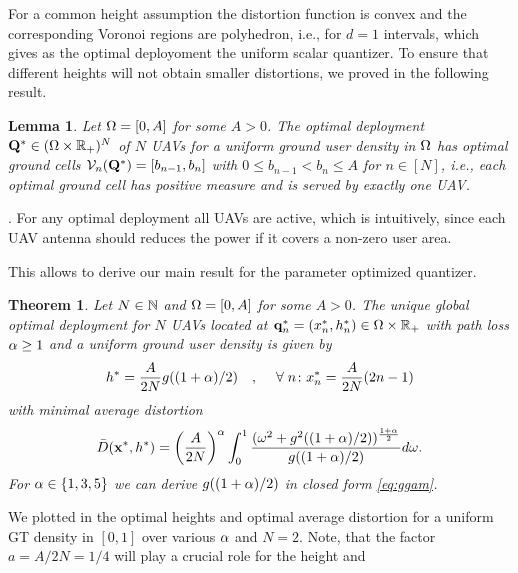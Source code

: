 \documentclass[smallabstract,smallcaptions]{dccpaper}
\newtheorem{lemma}{Lemma}
\newtheorem{theorem}{Theorem}
\newenvironment{remark}{\par\vspace{1.5ex}\noindent{\em Remark\/}.}{\par\vspace{1.5ex}}
\newcommand{\Vor}{\ensuremath{\mathcal{V}}}         %
\newcommand{\Dis}{\ensuremath{D}}                    %
\newcommand{\AvDis}{\ensuremath{\bar{\Dis}}}         %
\newcommand{\philippstart}{\color{black}}
\begin{document}
\newcommand{\pGlob}{\ensuremath{x^{*}}}
\newcommand{\hGlob}{\ensuremath{h^{*}}}
\newcommand{\qGlob}{\ensuremath{{\mathbf q}^{*}}}
\newcommand{\qLoc}{\ensuremath{{\mathbf q}^{*}}}
%
%
\philippstart
%
%
\color{black}

For a common height assumption the distortion function is convex and the corresponding Voronoi regions are polyhedron,
i.e., for $d=1$ intervals, which gives as the optimal deployoment the uniform scalar quantizer. To ensure that different
heights will not obtain smaller distortions, we proved in \cite{GWJ18a} the following result. 
%
\philippstart
%
\begin{lemma}\label{lemma:allActive}
  Let $\Omega=[0,A]$ for some $A>0$. The optimal deployment $\mathbf Q^*\in(\Omega\times{\ensuremath{\mathbb R}}_+)^N$ of $N$ UAVs for a uniform ground
  user density in $\Omega$ has optimal ground cells $\Vor_n(\vQ^*)=[b_{n-1},b_n]$ with $0\leq b_{n-1}<b_n\leq A$ for
  $n\in[N]$, i.e., each optimal ground cell has positive measure and is served by exactly one UAV. 
\end{lemma}
%
\begin{remark}
  For any optimal deployment all UAVs are active, which is intuitively, since each UAV
  antenna should reduces the power if it covers a non-zero user area.
\end{remark}
%
This allows to derive our main result for the parameter optimized quantizer.
%
\begin{theorem}\label{thm:commonheight}
  Let $N\in{\ensuremath{\mathbb N}}$ and $\Omega=[0,A]$ for some $A> 0$. The \emph{unique global optimal deployment} for $N$ UAVs located  at
  $\qLoc_n=(x_n^{*},h_n^{*})\in \Ome\times \R_+$ with path loss $\alpha\geq 1$ and a uniform ground user density is given
  by   
   \begin{align}
     h^*= \frac{A}{2N} g((1+\alp)/2)\quad,\quad\forall n \colon \pGlob_n= \frac{A}{2N} (2n-1)\label{eq:optimaldeploy} 
  \end{align}
  with minimal average distortion
  \begin{align}
    \AvDis(\vx^*,h^*)=\left(\frac{A}{2N}\right)^{\alp}  \int_0^1
    \frac{(\ome^2+g^2( (1+\alp)/2))^{\frac{1+\alp}{2}}}{g( (1+\alp)/2)}
    d\ome\label{eq:optimumavpow}.
  \end{align}
  For $\alpha\in\{1,3,5\}$ we can derive $g((1+\alpha)/2)$ in closed form  \eqref{eq:ggam}.
\end{theorem}
We plotted in  the optimal heights and optimal average distortion for a uniform GT density in
$[0,1]$ over various $\alpha$ and $N=2$. Note, that the factor $a=A/2N=1/4$ will play a crucial role for the height and
\end{document}
